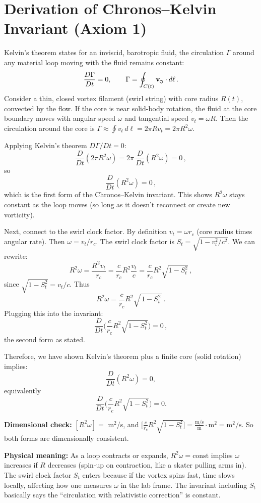 \documentclass[reprint,aps,onecolumn,nofootinbib]{revtex4-2}
\newcommand{\swirlarrow}{%
    \mathchoice{\mkern-2mu\scriptstyle\boldsymbol{\circlearrowleft}}%
    {\mkern-2mu\scriptstyle\boldsymbol{\circlearrowleft}}%
    {\mkern-2mu\scriptscriptstyle\boldsymbol{\circlearrowleft}}%
    {\mkern-2mu\scriptscriptstyle\boldsymbol{\circlearrowleft}}%
}
\newcommand{\vswirl}{\mathbf{v}_{\swirlarrow}}
\begin{document}
	\section{Derivation of Chronos–Kelvin Invariant (Axiom 1)}
	Kelvin’s theorem states for an inviscid, barotropic fluid, the circulation $\Gamma$ around any material loop moving with the fluid remains constant:
	\[
		\frac{D\Gamma}{Dt} = 0, \qquad \Gamma = \oint_{C(t)} \vswirl \cdot d\ell\,.
	\]
	Consider a thin, closed vortex filament (swirl string) with core radius $R(t)$, convected by the flow. If the core is near solid-body rotation, the fluid at the core boundary moves with angular speed $\omega$ and tangential speed $v_t = \omega R$. Then the circulation around the core is $\Gamma \approx \oint v_t\,d\ell = 2\pi R v_t = 2\pi R^2 \omega$.

	Applying Kelvin’s theorem $D\Gamma/Dt=0$:
	\[
		\frac{D}{Dt}(2\pi R^2 \omega) = 2\pi\,\frac{D}{Dt}(R^2 \omega) = 0\,,
	\]
	so
	\[
		\frac{D}{Dt}(R^2 \omega) = 0\,,
	\]
	which is the first form of the Chronos–Kelvin invariant. This shows $R^2 \omega$ stays constant as the loop moves (so long as it doesn’t reconnect or create new vorticity).

	Next, connect to the swirl clock factor. By definition $v_t = \omega r_c$ (core radius times angular rate). Then $\omega = v_t/r_c$. The swirl clock factor is $S_t = \sqrt{1 - v_t^2/c^2}$. We can rewrite:
	\[
		R^2 \omega = \frac{R^2 v_t}{r_c} = \frac{c}{r_c} R^2 \frac{v_t}{c} = \frac{c}{r_c} R^2 \sqrt{1 - S_t^2}\,,
	\]
	since $\sqrt{1 - S_t^2} = v_t/c$. Thus
	\[
		R^2 \omega = \frac{c}{r_c} R^2 \sqrt{\,1 - S_t^2\,}\,.
	\]
	Plugging this into the invariant:
	\[
		\frac{D}{Dt}\Big(\frac{c}{r_c} R^2 \sqrt{1 - S_t^2}\Big) = 0\,,
	\]
	the second form as stated.

	Therefore, we have shown Kelvin’s theorem plus a finite core (solid rotation) implies:
	\[
		\frac{D}{Dt}(R^2 \omega) = 0,
	\]
	equivalently
	\[
		\frac{D}{Dt}\Big(\frac{c}{r_c}R^2\sqrt{1 - S_t^2}\Big) = 0.
	\]

	\noindent\textbf{Dimensional check:} $[R^2 \omega] =$ m$^2$/s, and
	$\big[\frac{c}{r_c}R^2\sqrt{1 - S_t^2}\big] = \frac{\text{m/s}}{\text{m}} \cdot \text{m}^2 = \text{m}^2/\text{s}$. So both forms are dimensionally consistent.

	\noindent\textbf{Physical meaning:} As a loop contracts or expands, $R^2 \omega = \text{const}$ implies $\omega$ increases if $R$ decreases (spin-up on contraction, like a skater pulling arms in). The swirl clock factor $S_t$ enters because if the vortex spins fast, time slows locally, affecting how one measures $\omega$ in the lab frame. The invariant including $S_t$ basically says the “circulation with relativistic correction” is constant.
\end{document}
